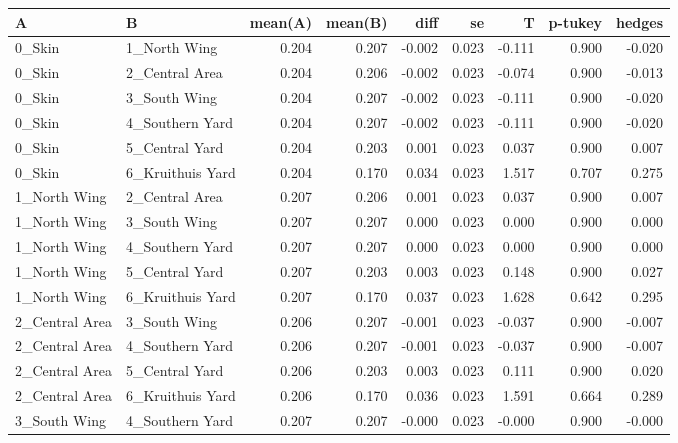 \begin{tabular}{llrrrrrrr}
\toprule
               A &                 B &  mean(A) &  mean(B) &   diff &     se &      T &  p-tukey &  hedges \\
\midrule
          0\_Skin &      1\_North Wing &    0.204 &    0.207 & -0.002 &  0.023 & -0.111 &    0.900 &  -0.020 \\
          0\_Skin &    2\_Central Area &    0.204 &    0.206 & -0.002 &  0.023 & -0.074 &    0.900 &  -0.013 \\
          0\_Skin &      3\_South Wing &    0.204 &    0.207 & -0.002 &  0.023 & -0.111 &    0.900 &  -0.020 \\
          0\_Skin &   4\_Southern Yard &    0.204 &    0.207 & -0.002 &  0.023 & -0.111 &    0.900 &  -0.020 \\
          0\_Skin &    5\_Central Yard &    0.204 &    0.203 &  0.001 &  0.023 &  0.037 &    0.900 &   0.007 \\
          0\_Skin &  6\_Kruithuis Yard &    0.204 &    0.170 &  0.034 &  0.023 &  1.517 &    0.707 &   0.275 \\
    1\_North Wing &    2\_Central Area &    0.207 &    0.206 &  0.001 &  0.023 &  0.037 &    0.900 &   0.007 \\
    1\_North Wing &      3\_South Wing &    0.207 &    0.207 &  0.000 &  0.023 &  0.000 &    0.900 &   0.000 \\
    1\_North Wing &   4\_Southern Yard &    0.207 &    0.207 &  0.000 &  0.023 &  0.000 &    0.900 &   0.000 \\
    1\_North Wing &    5\_Central Yard &    0.207 &    0.203 &  0.003 &  0.023 &  0.148 &    0.900 &   0.027 \\
    1\_North Wing &  6\_Kruithuis Yard &    0.207 &    0.170 &  0.037 &  0.023 &  1.628 &    0.642 &   0.295 \\
  2\_Central Area &      3\_South Wing &    0.206 &    0.207 & -0.001 &  0.023 & -0.037 &    0.900 &  -0.007 \\
  2\_Central Area &   4\_Southern Yard &    0.206 &    0.207 & -0.001 &  0.023 & -0.037 &    0.900 &  -0.007 \\
  2\_Central Area &    5\_Central Yard &    0.206 &    0.203 &  0.003 &  0.023 &  0.111 &    0.900 &   0.020 \\
  2\_Central Area &  6\_Kruithuis Yard &    0.206 &    0.170 &  0.036 &  0.023 &  1.591 &    0.664 &   0.289 \\
    3\_South Wing &   4\_Southern Yard &    0.207 &    0.207 & -0.000 &  0.023 & -0.000 &    0.900 &  -0.000 \\

\end{tabular}
